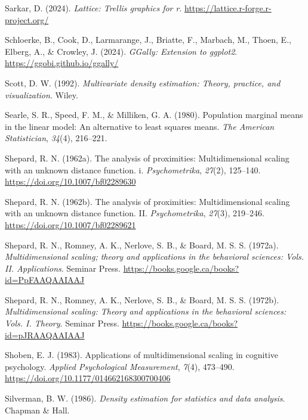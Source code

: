 \documentclass[
  letterpaper,
  10pt,
  krantz2]{krantz}
\newlength{\cslhangindent}
\newenvironment{CSLReferences}[2] %
 {\begin{list}{}{%
  \setlength{\itemindent}{0pt}
  \setlength{\leftmargin}{0pt}
  \setlength{\parsep}{0pt}
  \ifodd #1
   \setlength{\leftmargin}{\cslhangindent}
   \setlength{\itemindent}{-1\cslhangindent}
  \fi
  \setlength{\itemsep}{#2\baselineskip}}}
 {\end{list}}
\begin{document}
{\begin{CSLReferences}{1}{0}
Sarkar, D. (2024). \emph{Lattice: Trellis graphics for r}.
\url{https://lattice.r-forge.r-project.org/}

Schloerke, B., Cook, D., Larmarange, J., Briatte, F., Marbach, M.,
Thoen, E., Elberg, A., \& Crowley, J. (2024). \emph{GGally: Extension to
ggplot2}. \url{https://ggobi.github.io/ggally/}

Scott, D. W. (1992). \emph{Multivariate density estimation: Theory,
practice, and visualization}. Wiley.

Searle, S. R., Speed, F. M., \& Milliken, G. A. (1980). Population
marginal means in the linear model: An alternative to least squares
means. \emph{The American Statistician}, \emph{34}(4), 216--221.

Shepard, R. N. (1962a). The analysis of proximities: Multidimensional
scaling with an unknown distance function. i. \emph{Psychometrika},
\emph{27}(2), 125--140. \url{https://doi.org/10.1007/bf02289630}

Shepard, R. N. (1962b). The analysis of proximities: Multidimensional
scaling with an unknown distance function. II. \emph{Psychometrika},
\emph{27}(3), 219--246. \url{https://doi.org/10.1007/bf02289621}

Shepard, R. N., Romney, A. K., Nerlove, S. B., \& Board, M. S. S.
(1972a). \emph{Multidimensional scaling; theory and applications in the
behavioral sciences: Vols. II. Applications}. Seminar Press.
\url{https://books.google.ca/books?id=PpFAAQAAIAAJ}

Shepard, R. N., Romney, A. K., Nerlove, S. B., \& Board, M. S. S.
(1972b). \emph{Multidimensional scaling: Theory and applications in the
behavioral sciences: Vols. I. Theory}. Seminar Press.
\url{https://books.google.ca/books?id=pJRAAQAAIAAJ}

Shoben, E. J. (1983). Applications of multidimensional scaling in
cognitive psychology. \emph{Applied Psychological Measurement},
\emph{7}(4), 473--490. \url{https://doi.org/10.1177/014662168300700406}

Silverman, B. W. (1986). \emph{Density estimation for statistics and
data analysis}. Chapman \& Hall.


\end{CSLReferences}}
\end{document}
